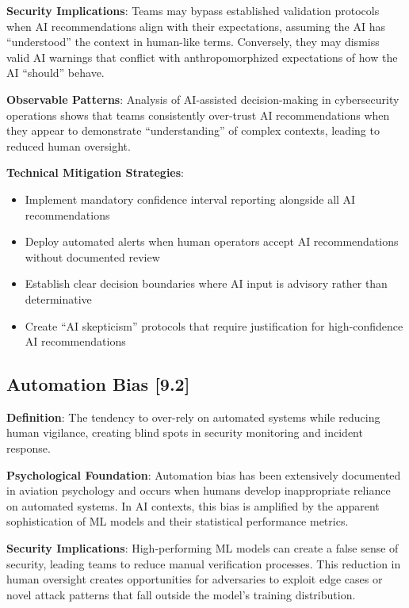 \documentclass[11pt,a4paper]{article}
\begin{document}
\textbf{Security Implications}: Teams may bypass established validation protocols when AI recommendations align with their expectations, assuming the AI has ``understood'' the context in human-like terms. Conversely, they may dismiss valid AI warnings that conflict with anthropomorphized expectations of how the AI ``should'' behave.

\textbf{Observable Patterns}: Analysis of AI-assisted decision-making in cybersecurity operations shows that teams consistently over-trust AI recommendations when they appear to demonstrate ``understanding'' of complex contexts, leading to reduced human oversight\cite{choudhary2024}.

\textbf{Technical Mitigation Strategies}:
\begin{itemize}
\item Implement mandatory confidence interval reporting alongside all AI recommendations
\item Deploy automated alerts when human operators accept AI recommendations without documented review
\item Establish clear decision boundaries where AI input is advisory rather than determinative
\item Create ``AI skepticism'' protocols that require justification for high-confidence AI recommendations
\end{itemize}

\subsection{Automation Bias [9.2]}

\textbf{Definition}: The tendency to over-rely on automated systems while reducing human vigilance, creating blind spots in security monitoring and incident response.

\textbf{Psychological Foundation}: Automation bias has been extensively documented in aviation psychology\cite{parasuraman2010} and occurs when humans develop inappropriate reliance on automated systems. In AI contexts, this bias is amplified by the apparent sophistication of ML models and their statistical performance metrics.

\textbf{Security Implications}: High-performing ML models can create a false sense of security, leading teams to reduce manual verification processes. This reduction in human oversight creates opportunities for adversaries to exploit edge cases or novel attack patterns that fall outside the model's training distribution.
\end{document}

